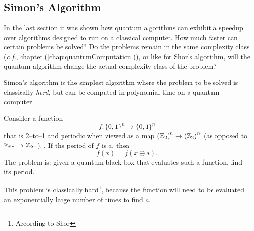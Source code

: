 \subsection{Simon's Algorithm}

In the last section it was shown how quantum algorithms can
exhibit a speedup over algorithms designed to run on a classical
computer.  How much faster can certain problems be solved?
Do the problems remain in the same complexity class ({\it c.f.},
chapter (\ref{chap:quantumComputation})), or like for Shor's 
algorithm, will the quantum algorithm change the actual 
complexity class of the problem?

Simon's algorithm\cite{Simon:97} 
is the simplest algorithm where the problem to
be solved is classically \emph{hard}, but can be computed in
polynomial time on a quantum computer.

Consider a function 
\begin{equation}
f\colon\lbrace 0,1\rbrace^n\to\lbrace 0,1\rbrace^n
\end{equation}
that is 2--to--1 and periodic when viewed as a map 
$\left({\mathbb{Z}}_2\right)^n\to\left({\mathbb{Z}}_2\right)^n$
(as opposed to ${\mathbb{Z}}_{2^n}\to{\mathbb{Z}}_{2^n}$).
\ie, If the period of $f$ is $a$, then
\begin{equation}
f(x) = f(x\oplus a).
\end{equation}
The problem is: given a quantum black box that evaluates such a function,
find its period.

This problem is classically hard\footnote{According to Shor\cite{Shor:00}},
because the function will need to be evaluated an exponentially large number
of times to find $a$.

